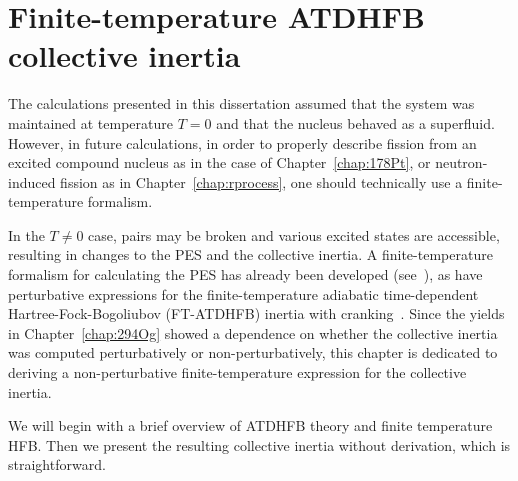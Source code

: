 \chapter{Finite-temperature ATDHFB collective inertia}\label{append:TD-ATDHFB}




The calculations presented in this dissertation assumed that the system was maintained at temperature $T=0$ and that the nucleus behaved as a superfluid. However, in future calculations, in order to properly describe fission from an excited compound nucleus as in the case of Chapter~\ref{chap:178Pt}, or neutron-induced fission as in Chapter~\ref{chap:rprocess}, one should technically use a finite-temperature formalism.

In the $T\neq0$ case, pairs may be broken and various excited states are accessible, resulting in changes to the PES and the collective inertia. A finite-temperature formalism for calculating the PES has already been developed (see~\cite{Schunck2015b, Mcdonnell2014}), as have perturbative expressions for the finite-temperature adiabatic time-dependent Hartree-Fock-Bogoliubov (FT-ATDHFB) inertia with cranking~\cite{Egido1986, Martin2009, Schunck2019edf}. Since the yields in Chapter~\ref{chap:294Og} showed a dependence on whether the collective inertia was computed perturbatively or non-perturbatively, this chapter is dedicated to deriving a non-perturbative finite-temperature expression for the collective inertia.

We will begin with a brief overview of ATDHFB theory and finite temperature HFB. Then we present the resulting collective inertia without derivation, which is straightforward.



